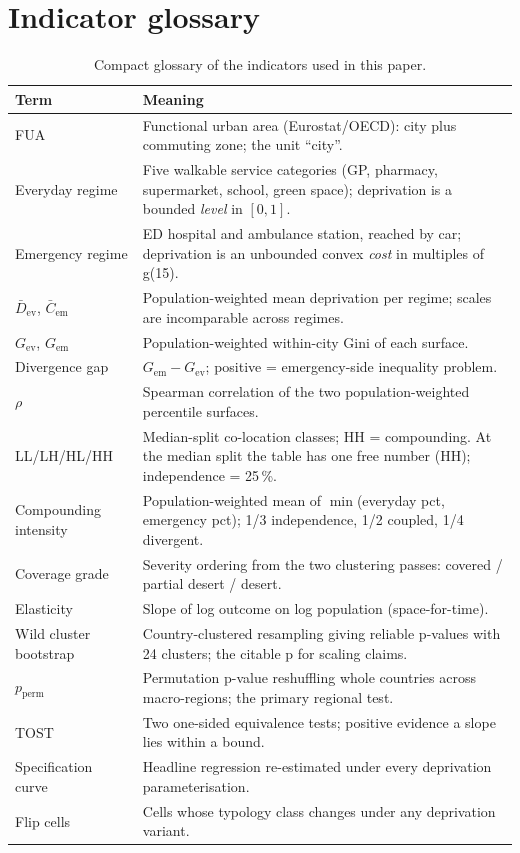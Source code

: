 \documentclass[11pt]{article}
\newcommand{\gref}{g(15)}          %
\begin{document}
\section{Indicator glossary}\label{si:glossary}

\begin{table}[H]
\centering
\caption{Compact glossary of the indicators used in this paper.}
\label{tab:si-glossary}
\small
\begin{tabular}{@{}p{}p{}@{}}
\toprule
Term & Meaning \\
\midrule
FUA & Functional urban area (Eurostat/OECD): city plus commuting zone; the unit ``city''. \\
Everyday regime & Five walkable service categories (GP, pharmacy, supermarket, school, green space); deprivation is a bounded \emph{level} in $[0,1]$. \\
Emergency regime & ED hospital and ambulance station, reached by car; deprivation is an unbounded convex \emph{cost} in multiples of \gref{}. \\
$\bar D_{\mathrm{ev}}$, $\bar C_{\mathrm{em}}$ & Population-weighted mean deprivation per regime; scales are incomparable across regimes. \\
$G_{\mathrm{ev}}$, $G_{\mathrm{em}}$ & Population-weighted within-city Gini of each surface. \\
Divergence gap & $G_{\mathrm{em}} - G_{\mathrm{ev}}$; positive = emergency-side inequality problem. \\
$\rho$ & Spearman correlation of the two population-weighted percentile surfaces. \\
LL/LH/HL/HH & Median-split co-location classes; HH = compounding. At the median split the table has one free number (HH); independence = 25\,\%. \\
Compounding intensity & Population-weighted mean of $\min$(everyday pct, emergency pct); 1/3 independence, 1/2 coupled, 1/4 divergent. \\
Coverage grade & Severity ordering from the two clustering passes: covered / partial desert / desert. \\
Elasticity & Slope of log outcome on log population (space-for-time). \\
Wild cluster bootstrap & Country-clustered resampling giving reliable p-values with 24 clusters; the citable p for scaling claims. \\
$p_{\mathrm{perm}}$ & Permutation p-value reshuffling whole countries across macro-regions; the primary regional test. \\
TOST & Two one-sided equivalence tests; positive evidence a slope lies within a bound. \\
Specification curve & Headline regression re-estimated under every deprivation parameterisation. \\
Flip cells & Cells whose typology class changes under any deprivation variant. \\
\bottomrule
\end{tabular}
\end{table}
\end{document}
